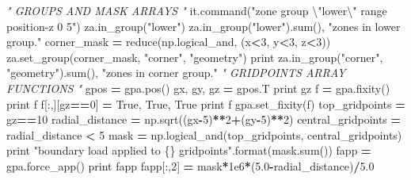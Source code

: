 \documentclass[a4paper, nobind]{templates/ociamthesis}
\newenvironment{Shaded}{\begin{snugshade}}{\end{snugshade}}
\newcommand{\BuiltInTok}[1]{#1}
\newcommand{\CharTok}[1]{\textcolor[rgb]{0.31,0.60,0.02}{#1}}
\newcommand{\CommentTok}[1]{\textcolor[rgb]{0.56,0.35,0.01}{\textit{#1}}}
\newcommand{\DecValTok}[1]{\textcolor[rgb]{0.00,0.00,0.81}{#1}}
\newcommand{\FloatTok}[1]{\textcolor[rgb]{0.00,0.00,0.81}{#1}}
\newcommand{\NormalTok}[1]{#1}
\newcommand{\OperatorTok}[1]{\textcolor[rgb]{0.81,0.36,0.00}{\textbf{#1}}}
\newcommand{\SpecialCharTok}[1]{\textcolor[rgb]{0.00,0.00,0.00}{#1}}
\newcommand{\StringTok}[1]{\textcolor[rgb]{0.31,0.60,0.02}{#1}}
\newcommand{\VariableTok}[1]{\textcolor[rgb]{0.00,0.00,0.00}{#1}}
\renewenvironment{Shaded}
{
  \vspace{10pt}%
  \begin{snugshade}%
}{%
  \end{snugshade}%
  \vspace{8pt}%
}
\begin{document}
\begin{Shaded}
\begin{Highlighting}[]
\CommentTok{" GROUPS AND MASK ARRAYS "}
\NormalTok{it.command(}\StringTok{"zone group }\CharTok{\textbackslash{}"}\StringTok{lower}\CharTok{\textbackslash{}"}\StringTok{ range position{-}z 0 5"}\NormalTok{)}
\NormalTok{za.in\_group(}\StringTok{"lower"}\NormalTok{)}
\NormalTok{za.in\_group(}\StringTok{"lower"}\NormalTok{).}\BuiltInTok{sum}\NormalTok{(), }\StringTok{"zones in lower group."}
\NormalTok{corner\_mask }\OperatorTok{=} \BuiltInTok{reduce}\NormalTok{(np.logical\_and, (x}\OperatorTok{\textless{}}\DecValTok{3}\NormalTok{, y}\OperatorTok{\textless{}}\DecValTok{3}\NormalTok{, z}\OperatorTok{\textless{}}\DecValTok{3}\NormalTok{))}
\NormalTok{za.set\_group(corner\_mask, }\StringTok{"corner"}\NormalTok{, }\StringTok{"geometry"}\NormalTok{)}
\BuiltInTok{print}\NormalTok{ za.in\_group(}\StringTok{"corner"}\NormalTok{, }\StringTok{"geometry"}\NormalTok{).}\BuiltInTok{sum}\NormalTok{(), }\StringTok{"zones in corner group."}
\CommentTok{" GRIDPOINTS ARRAY FUNCTIONS "}
\NormalTok{gpos }\OperatorTok{=}\NormalTok{ gpa.pos()}
\NormalTok{gx, gy, gz }\OperatorTok{=}\NormalTok{ gpos.T}
\BuiltInTok{print}\NormalTok{ gz}
\NormalTok{f }\OperatorTok{=}\NormalTok{ gpa.fixity()}
\BuiltInTok{print}\NormalTok{ f}
\NormalTok{f[:,][gz}\OperatorTok{==}\DecValTok{0}\NormalTok{] }\OperatorTok{=} \VariableTok{True}\NormalTok{, }\VariableTok{True}\NormalTok{, }\VariableTok{True}
\BuiltInTok{print}\NormalTok{ f}
\NormalTok{gpa.set\_fixity(f)}
\NormalTok{top\_gridpoints }\OperatorTok{=}\NormalTok{ gz}\OperatorTok{==}\DecValTok{10}
\NormalTok{radial\_distance }\OperatorTok{=}\NormalTok{ np.sqrt((gx}\OperatorTok{{-}}\DecValTok{5}\NormalTok{)}\OperatorTok{**}\DecValTok{2}\OperatorTok{+}\NormalTok{(gy}\OperatorTok{{-}}\DecValTok{5}\NormalTok{)}\OperatorTok{**}\DecValTok{2}\NormalTok{)}
\NormalTok{central\_gridpoints }\OperatorTok{=}\NormalTok{ radial\_distance }\OperatorTok{\textless{}} \DecValTok{5}
\NormalTok{mask }\OperatorTok{=}\NormalTok{ np.logical\_and(top\_gridpoints, central\_gridpoints)}
\BuiltInTok{print} \StringTok{"boundary load applied to }\SpecialCharTok{\{\}}\StringTok{ gridpoints"}\NormalTok{.}\BuiltInTok{format}\NormalTok{(mask.}\BuiltInTok{sum}\NormalTok{())}
\NormalTok{fapp }\OperatorTok{=}\NormalTok{ gpa.force\_app()}
\BuiltInTok{print}\NormalTok{ fapp}
\NormalTok{fapp[:,}\DecValTok{2}\NormalTok{] }\OperatorTok{=}\NormalTok{ mask}\OperatorTok{*}\FloatTok{1e6}\OperatorTok{*}\NormalTok{(}\FloatTok{5.0}\OperatorTok{{-}}\NormalTok{radial\_distance)}\OperatorTok{/}\FloatTok{5.0}

\end{Highlighting}
\end{Shaded}
\end{document}
